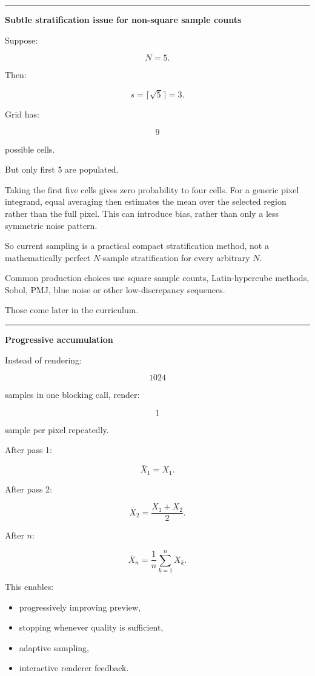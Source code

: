 \begin{center}\rule{0.5\linewidth}{0.5pt}\end{center}

\textbf{Subtle stratification issue for non-square sample counts}

Suppose:

\[
N=5.
\]

Then:

\[
s=\lceil\sqrt5\rceil=3.
\]

Grid has:

\[
9
\]

possible cells.

But only first 5 are populated.

Taking the first five cells gives zero probability to four cells. For a generic pixel integrand, equal averaging then estimates the mean over the selected region rather than the full pixel. This can introduce bias, rather than only a less symmetric noise pattern.

So current sampling is a practical compact stratification method, not a mathematically perfect \(N\)-sample stratification for every arbitrary \(N\).

Common production choices use square sample counts, Latin-hypercube methods, Sobol, PMJ, blue noise or other low-discrepancy sequences.

Those come later in the curriculum.

\begin{center}\rule{0.5\linewidth}{0.5pt}\end{center}

\textbf{Progressive accumulation}

Instead of rendering:

\[
1024
\]

samples in one blocking call, render:

\[
1
\]

sample per pixel repeatedly.

After pass 1:

\[
\bar X_1=X_1.
\]

After pass 2:

\[
\bar X_2=\frac{X_1+X_2}{2}.
\]

After \(n\):

\[
\boxed{
\bar X_n
=
\frac1n
\sum_{k=1}^nX_k.
}
\]

This enables:

\begin{itemize}
\tightlist
\item
  progressively improving preview,
\item
  stopping whenever quality is sufficient,
\item
  adaptive sampling,
\item
  interactive renderer feedback.
\end{itemize}

